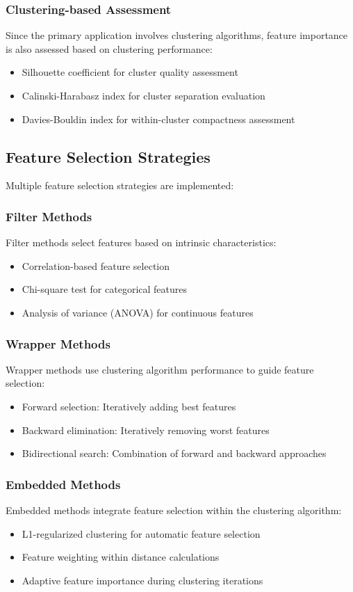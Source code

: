 \subsubsection{Clustering-based Assessment}
Since the primary application involves clustering algorithms, feature importance is also assessed based on clustering performance:
\begin{itemize}
\item Silhouette coefficient for cluster quality assessment
\item Calinski-Harabasz index for cluster separation evaluation
\item Davies-Bouldin index for within-cluster compactness assessment
\end{itemize}

\subsection{Feature Selection Strategies}
Multiple feature selection strategies are implemented:

\subsubsection{Filter Methods}
Filter methods select features based on intrinsic characteristics:
\begin{itemize}
\item Correlation-based feature selection
\item Chi-square test for categorical features
\item Analysis of variance (ANOVA) for continuous features
\end{itemize}

\subsubsection{Wrapper Methods}
Wrapper methods use clustering algorithm performance to guide feature selection:
\begin{itemize}
\item Forward selection: Iteratively adding best features
\item Backward elimination: Iteratively removing worst features
\item Bidirectional search: Combination of forward and backward approaches
\end{itemize}

\subsubsection{Embedded Methods}
Embedded methods integrate feature selection within the clustering algorithm:
\begin{itemize}
\item L1-regularized clustering for automatic feature selection
\item Feature weighting within distance calculations
\item Adaptive feature importance during clustering iterations
\end{itemize}

